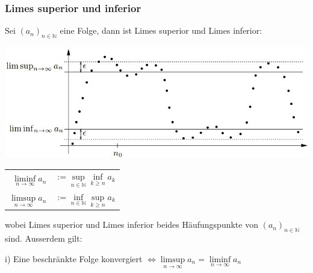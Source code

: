 \documentclass[a4paper, fontsize = 8pt, landscape]{scrartcl}
\newcommand{\N}[0]{\mathbb{N}}
\begin{document}
\begin{multicols*}{3}
    \subsubsection{Limes superior und inferior}

    Sei $(a_n)_{n \in \mathbb{N}}$ eine Folge, dann ist Limes superior und Limes inferior:

    \begin{center}
        \begin{minipage}{0.5\linewidth}
            \begin{center}
                \includegraphics[width=1\linewidth]{Bilder/z_03.jpg}
            \end{center}
        \end{minipage}
        \begin{minipage}{0.47 \linewidth}
            \begin{center}
                \renewcommand{\arraystretch}{1.25}
                \begin{tabular}{r l} \toprule
                    $\liminf\limits_{n \to \infty} a_n$ & \hspace*{-10pt}$:= \sup\limits_{n \in \mathbb{N}}\inf\limits_{k \geq n} a_k$  \\
                    $\limsup\limits_{n \to \infty} a_n$ & \hspace*{-10pt}$:= \inf\limits_{n \in \mathbb{N}}\sup\limits_{k \geq n} a_k $ \\
                    \bottomrule
                \end{tabular}
            \end{center}
        \end{minipage}
    \end{center}

    wobei Limes superior und Limes inferior beides Häufungspunkte von $(a_n)_{n \in \N}$ sind. Ausserdem gilt: \medskip


    i) Eine beschränkte Folge konvergiert $\Leftrightarrow \limsup\limits_{n \to \infty} a_n = \liminf\limits_{n \to \infty} a_n$


\end{multicols*}
\end{document}
